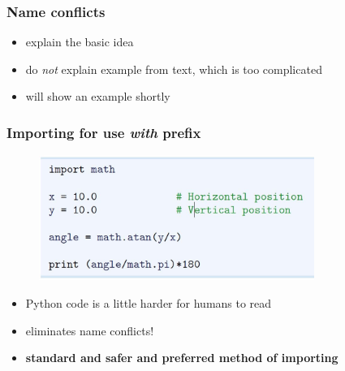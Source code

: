 \documentclass[14pt]{beamer}
\newcommand\red[1]{{\color{red} #1}}
\newcommand\green[1]{{\color{green} #1}}
\newcommand{\cmark}{\ding{51}}%
\newcommand{\xmark}{\ding{55}}%
\begin{document}

\begin{frame}[fragile]
\frametitle{Name conflicts}
\begin{itemize}
\item explain the basic idea
\item do \emph{not} explain example from text, which is too complicated
\item will show an example shortly
\end{itemize}

\end{frame}


\begin{frame}[fragile]
\frametitle{Importing for use \emph{with} prefix}

\begin{figure}[ht]
	\centering
	\includegraphics[width=0.8\textwidth]{figures/LLp14}
\end{figure}
\begin{itemize}
\item[\red{\xmark}] Python code is a little harder for humans to read
\item[\green{\cmark}\green{\cmark}] eliminates name conflicts!
\item \textbf{standard and safer and preferred method of importing}
\end{itemize}

\end{frame}

\end{document}
